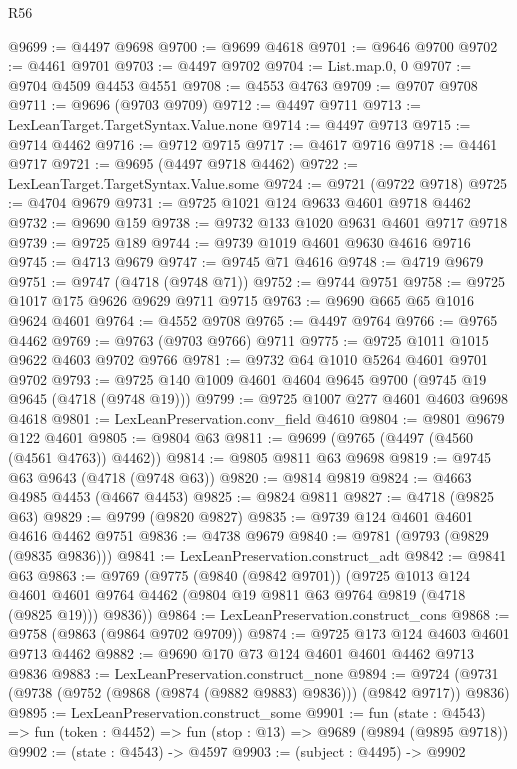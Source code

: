 \begin{lexlean}{R56}
\begin{coremodule}
@9699 := @4497 @9698
@9700 := @9699 @4618
@9701 := @9646 @9700
@9702 := @4461 @9701
@9703 := @4497 @9702
@9704 := List.map.{0, 0}
@9707 := @9704 @4509 @4453 @4551
@9708 := @4553 @4763
@9709 := @9707 @9708
@9711 := @9696 (@9703 @9709)
@9712 := @4497 @9711
@9713 := LexLeanTarget.TargetSyntax.Value.none
@9714 := @4497 @9713
@9715 := @9714 @4462
@9716 := @9712 @9715
@9717 := @4617 @9716
@9718 := @4461 @9717
@9721 := @9695 (@4497 @9718 @4462)
@9722 := LexLeanTarget.TargetSyntax.Value.some
@9724 := @9721 (@9722 @9718)
@9725 := @4704 @9679
@9731 := @9725 @1021 @124 @9633 @4601 @9718 @4462
@9732 := @9690 @159
@9738 := @9732 @133 @1020 @9631 @4601 @9717 @9718
@9739 := @9725 @189
@9744 := @9739 @1019 @4601 @9630 @4616 @9716
@9745 := @4713 @9679
@9747 := @9745 @71 @4616
@9748 := @4719 @9679
@9751 := @9747 (@4718 (@9748 @71))
@9752 := @9744 @9751
@9758 := @9725 @1017 @175 @9626 @9629 @9711 @9715
@9763 := @9690 @665 @65 @1016 @9624 @4601
@9764 := @4552 @9708
@9765 := @4497 @9764
@9766 := @9765 @4462
@9769 := @9763 (@9703 @9766) @9711
@9775 := @9725 @1011 @1015 @9622 @4603 @9702 @9766
@9781 := @9732 @64 @1010 @5264 @4601 @9701 @9702
@9793 := @9725 @140 @1009 @4601 @4604 @9645 @9700 (@9745 @19 @9645 (@4718 (@9748 @19)))
@9799 := @9725 @1007 @277 @4601 @4603 @9698 @4618
@9801 := LexLeanPreservation.conv_field @4610
@9804 := @9801 @9679 @122 @4601
@9805 := @9804 @63
@9811 := @9699 (@9765 (@4497 (@4560 (@4561 @4763)) @4462))
@9814 := @9805 @9811 @63 @9698
@9819 := @9745 @63 @9643 (@4718 (@9748 @63))
@9820 := @9814 @9819
@9824 := @4663 @4985 @4453 (@4667 @4453)
@9825 := @9824 @9811
@9827 := @4718 (@9825 @63)
@9829 := @9799 (@9820 @9827)
@9835 := @9739 @124 @4601 @4601 @4616 @4462 @9751
@9836 := @4738 @9679
@9840 := @9781 (@9793 (@9829 (@9835 @9836)))
@9841 := LexLeanPreservation.construct_adt
@9842 := @9841 @63
@9863 := @9769
    (@9775
      (@9840 (@9842 @9701))
      (@9725
        @1013
        @124
        @4601
        @4601
        @9764
        @4462
        (@9804 @19 @9811 @63 @9764 @9819 (@4718 (@9825 @19)))
        @9836))
@9864 := LexLeanPreservation.construct_cons
@9868 := @9758 (@9863 (@9864 @9702 @9709))
@9874 := @9725 @173 @124 @4603 @4601 @9713 @4462
@9882 := @9690 @170 @73 @124 @4601 @4601 @4462 @9713 @9836
@9883 := LexLeanPreservation.construct_none
@9894 := @9724 (@9731 (@9738 (@9752 (@9868 (@9874 (@9882 @9883) @9836))) (@9842 @9717)) @9836)
@9895 := LexLeanPreservation.construct_some
@9901 := fun (state : @4543) =>
  fun (token : @4452) => fun (stop : @13) => @9689 (@9894 (@9895 @9718))
@9902 := (state : @4543) -> @4597
@9903 := (subject : @4495) -> @9902

\end{coremodule}
\end{lexlean}
